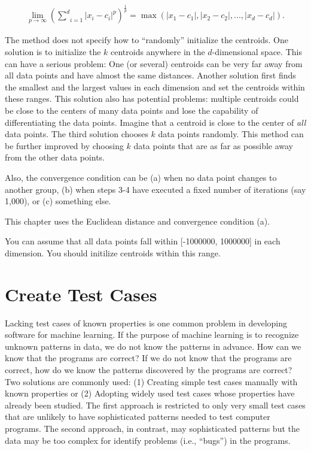 \begin{gather}
  \underset{p \rightarrow \infty}{\lim}(\underset{i=1}{\overset{d}{\sum}} |x_i - c_i| ^ p) ^ {\frac{1}{p}}
  = \max(|x_1 - c_1|, |x_2 - c_2|, ..., |x_d - c_d|).
\end{gather}

The method does not specify how to ``randomly'' initialize the
centroids. One solution is to initialize the $k$ centroids anywhere in
the $d$-dimensional space.  This can have a serious problem: One (or
several) centroids can be very far away from all data points and have
almost the same distances.  Another solution first finds the smallest
and the largest values in each dimension and set the centroids within
these ranges.  This solution also has potential problems: multiple
centroids could be close to the centers of many data points and lose
the capability of differentiating the data points.  Imagine that a
centroid is close to the center of {\it all} data points.  The third
solution chooses $k$ data points randomly.  This method can be further
improved by choosing $k$ data points that are as far as possible away
from the other data points.






Also, the convergence condition can be (a) when no data
point changes to another group, (b) when steps 3-4 have executed a
fixed number of iterations (say 1,000), or (c) something else.

This chapter uses the Euclidean distance and convergence condition
(a).

You can assume that all data points fall within [-1000000, 1000000] in
   each dimension. You should initilize centroids within this range.

   
\section{Create Test Cases}

Lacking test cases of known properties is one common problem in
developing software for machine learning.  If the purpose of machine
learning is to recognize unknown patterns in data, we do not know the
patterns in advance.  How can we know that the programs are correct?
If we do not know that the programs are correct, how do we know the
patterns discovered by the programs are correct?  Two solutions are
commonly used: (1) Creating simple test cases manually with known
properties or (2) Adopting widely used test cases whose properties
have already been studied. The first approach is restricted to only
very small test cases that are unlikely to have sophisticated patterns
needed to test computer programs.  The second approach, in contrast,
may sophisticated patterns but the data may be too complex for
identify problems (i.e., ``bugs'') in the programs.

